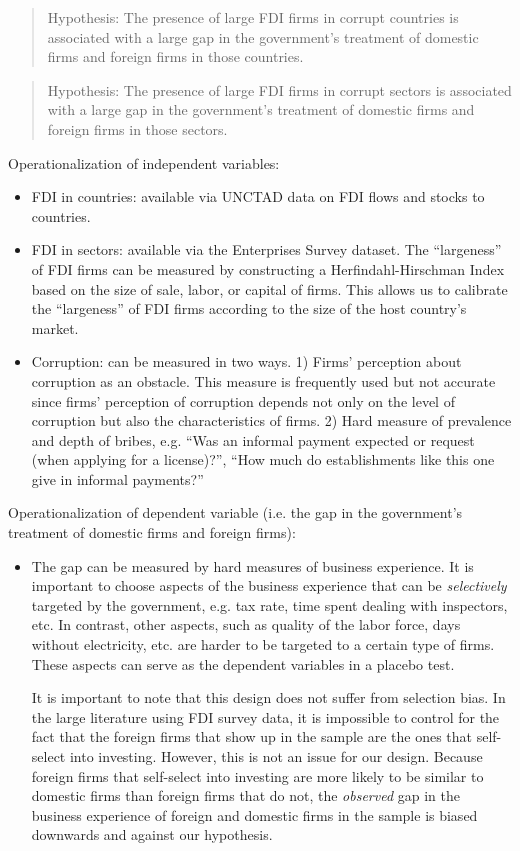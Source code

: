 \begin{quote}
Hypothesis: The presence of large FDI firms in corrupt countries is associated with a large gap in the government's treatment of domestic firms and foreign firms in those countries.
\end{quote}

\begin{quote}
Hypothesis: The presence of large FDI firms in corrupt sectors is associated with a large gap in the government's treatment of domestic firms and foreign firms in those sectors.
\end{quote}

Operationalization of independent variables:
\begin{itemize}
\item FDI in countries: available via UNCTAD data on FDI flows and stocks to countries.

\item FDI in sectors: available via the Enterprises Survey dataset. The ``largeness'' of FDI firms can be measured by constructing a Herfindahl-Hirschman Index based on the size of sale, labor, or capital of firms. This allows us to calibrate the ``largeness'' of FDI firms according to the size of the host country's market.

\item Corruption: can be measured in two ways. 1) Firms' perception about corruption as an obstacle. This measure is frequently used but not accurate since firms' perception of corruption depends not only on the level of corruption but also the characteristics of firms. 2) Hard measure of prevalence and depth of bribes, e.g. ``Was an informal payment expected or request (when applying for a license)?'', ``How much do establishments like this one give in informal payments?'' 
\end{itemize}

Operationalization of dependent variable (i.e. the gap in the government's treatment of domestic firms and foreign firms):
\begin{itemize}
\item The gap can be measured by hard measures of business experience. It is important to choose aspects of the business experience that can be \textit{selectively} targeted by the government, e.g. tax rate, time spent dealing with inspectors, etc. In contrast, other aspects, such as quality of the labor force, days without electricity, etc. are harder to be targeted to a certain type of firms. These aspects can serve as the dependent variables in a placebo test.

It is important to note that this design does not suffer from selection bias. In the large literature using FDI survey data, it is impossible to control for the fact that the foreign firms that show up in the sample are the ones that self-select into investing. However, this is not an issue for our design. Because foreign firms that self-select into investing are more likely to be similar to domestic firms than foreign firms that do not, the \textit{observed} gap in the business experience of foreign and domestic firms in the sample is biased downwards and against our hypothesis.
\end{itemize}

